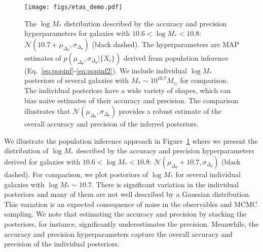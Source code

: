 \begin{figure}
\begin{center}
\texttt{[image: figs/etas\_demo.pdf]}
    \caption{
    The $\log M_*$ distribution described by the accuracy and precision
    hyperparameters for galaxies with $10.6 < \log M_* < 10.8$:
    $\mathcal{N}(10.7 + \mu_{\Delta_\theta}, \sigma_{\Delta_\theta})$ 
    (black dashed).
    The hyperparameters are MAP estimates of $p( \mu_{\Delta_\theta}, 
    \sigma_{\Delta_\theta} | \{ X_i \})$ derived from population inference
    (Eq.~\ref{eq:popinf}-\ref{eq:popinf2}). 
    We include individual $\log M_*$ posteriors of several galaxies with $M_*
    \sim 10^{10.7} M_\odot$ for comparison.   
    The individual posteriors have a wide variety of shapes, which can bias 
    naive estimates of their accuracy and precision. 
    The comparison illustrates that 
    $\mathcal{N}(\mu_{\Delta_\theta}, \sigma_{\Delta_\theta})$ provides a
    robust estimate of the overall accuracy and precision of the inferred
    posteriors. 
    }\label{fig:eta_demo}
\end{center}
\end{figure}
We illustrate the population inference approach in Figure~\ref{fig:eta_demo} 
where we present the distribution of $\log M_*$ described by the accuracy and
precision hyperparameters derived for galaxies with $10.6 < \log M_* < 10.8$: 
$\mathcal{N}(\mu_{\Delta_\theta} + 10.7, \sigma_{\Delta_\theta})$ (black
dashed). 
For comparison, we plot posteriors of $\log M_*$ for several individual
galaxies with $\log M_* \sim 10.7$.  
There is significant variation in the individual posteriors and many of them
are not well described by a Gaussian distribution. 
This variation is an expected consequence of noise in the observables and
MCMC sampling.  
We note that estimating the accuracy and precision by stacking the posteriors,
for instance, significantly underestimates the precision.  
Meanwhile, the accuracy and precision hyperparameters capture the overall
accuracy and precision of the individual posteriors. 
